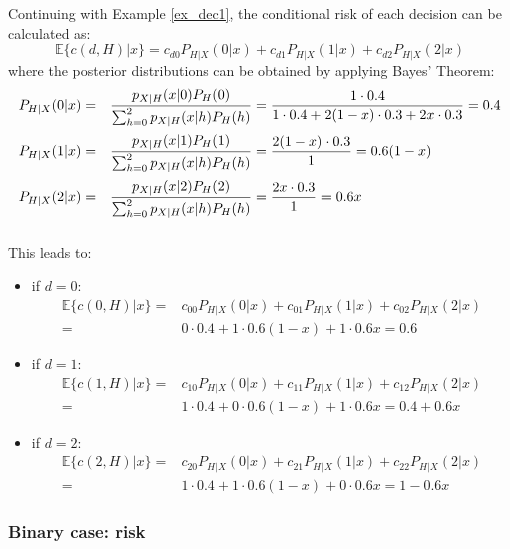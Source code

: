 \begin{example} \label{ex_dec2}
Continuing with Example \ref{ex_dec1}, the conditional risk of each decision can be calculated as:
$$\mathbb{E}\{c(d,H)|x\}=  c_{d0} P_{H|X}(0|x) +  c_{d1} P_{H|X}(1|x) + c_{d2} P_{H|X}(2|x) $$
where the posterior distributions can be obtained by applying Bayes' Theorem:
$$\begin{array}{rl} \vspace{0.2cm}
P_{H|X}(0|x) =& \displaystyle \frac{p_{X|H}(x|0) P_H(0)}{\sum_{h=0}^{2} p_{X|H}(x|h) P_H(h) }= \frac{1 \cdot 0.4} { 1 \cdot 0.4 + 2(1-x) \cdot 0.3 + 2x \cdot 0.3} =0.4 \\ \vspace{0.2cm}
P_{H|X}(1|x) =& \displaystyle \frac{p_{X|H}(x|1) P_H(1)}{\sum_{h=0}^{2} p_{X|H}(x|h) P_H(h) }= \frac{2(1-x)\cdot 0.3} { 1 } =0.6(1-x) \\ \vspace{0.2cm}
P_{H|X}(2|x) = &\displaystyle  \frac{p_{X|H}(x|2) P_H(2)}{\sum_{h=0}^{2} p_{X|H}(x|h) P_H(h) }= \frac{2x\cdot 0.3} { 1 } =0.6x  \vspace{0.2cm}
\end{array} $$
This leads to:

\begin{itemize}
\item if $d=0$:
$$\begin{array}{rl} 
\mathbb{E}\{c(0,H)|x\}= &  c_{00} P_{H|X}(0|x) +  c_{01} P_{H|X}(1|x) + c_{02} P_{H|X}(2|x) \\
= & 0 \cdot 0.4+ 1 \cdot 0.6(1-x) + 1 \cdot 0.6x= 0.6 
\end{array}$$
\item if $d=1$:
$$\begin{array}{rl} 
\mathbb{E}\{c(1,H)|x\}= &  c_{10} P_{H|X}(0|x) +  c_{11} P_{H|X}(1|x) + c_{12} P_{H|X}(2|x) \\
= & 1 \cdot 0.4+ 0 \cdot 0.6(1-x) + 1 \cdot 0.6x= 0.4+0.6x 
\end{array}$$
\item if  $d=2$:
$$\begin{array}{rl} 
\mathbb{E}\{c(2,H)|x\}= &  c_{20} P_{H|X}(0|x) +  c_{21} P_{H|X}(1|x) + c_{22} P_{H|X}(2|x) \\
=& 1 \cdot 0.4+ 1 \cdot 0.6(1-x) + 0 \cdot 0.6x=  1-0.6x 
\end{array}$$
\end{itemize} 
\end{example}

\subsubsection{Binary case: risk}

